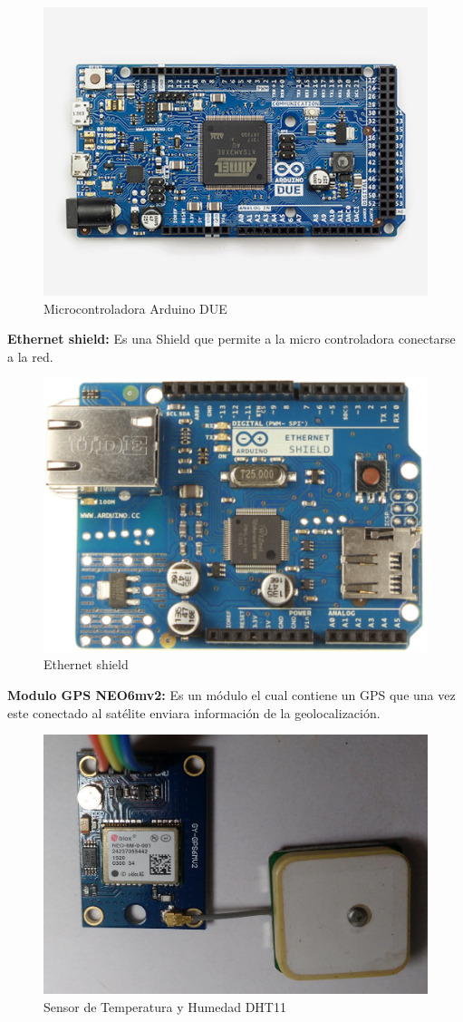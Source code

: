 \begin{figure}[!h]
	\centering
	\includegraphics[width=0.5\linewidth]{figuras/arddue}
	\caption{Microcontroladora Arduino DUE \cite{Arduino}}
	\label{fig:imgdue}
\end{figure}

\setlength{\parindent}{0ex}\textbf{Ethernet shield:} Es una Shield que permite a la micro controladora conectarse a la red.

\begin{figure}[!h]
	\centering
	\includegraphics[width=0.4\linewidth]{figuras/ethshi}
	\caption{Ethernet shield \cite{Arduino}}
	\label{fig:imgethshi}
\end{figure}

\setlength{\parindent}{0ex}\textbf{Modulo GPS NEO6mv2: }Es un módulo el cual contiene un GPS que una vez este conectado al satélite enviara información de la geolocalización.

	\begin{figure}[!h]
		\centering
		\includegraphics[width=0.5\linewidth]{figuras/neo6mv2}
		\caption{Sensor de Temperatura y Humedad DHT11}
		\label{fig:dht11}
	\end{figure}


